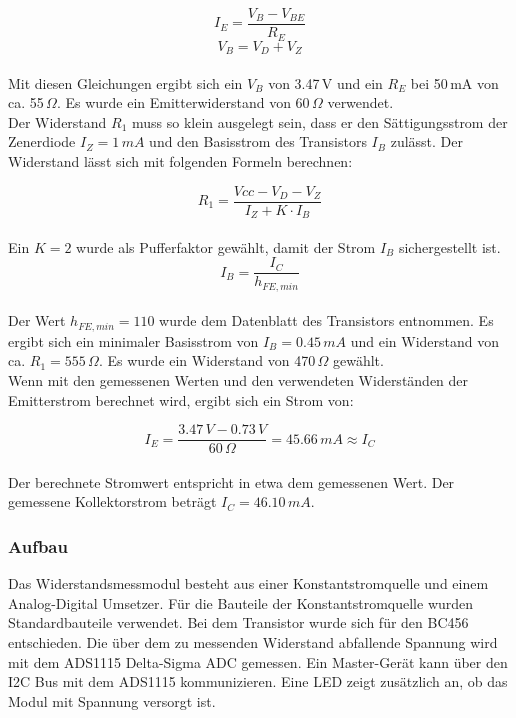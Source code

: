 \vspace{10pt}
\begin{equation}
	I_E = \frac{V_B - V_{BE}}{R_E}
\end{equation}
\begin{equation}
	V_B = V_D + V_Z
\end{equation}
\vspace{10pt}
\\
Mit diesen Gleichungen ergibt sich ein \(V_B\) von 3.47\,V und ein \(R_E\) bei 50\,mA von ca. 55\,\(\Omega\). Es wurde ein Emitterwiderstand von 60\,\(\Omega\) verwendet.
\\
Der Widerstand \(R_1\) muss so klein ausgelegt sein, dass er den Sättigungsstrom der Zenerdiode \(I_Z = 1\,mA\) und den Basisstrom des Transistors \(I_B\) zulässt. Der Widerstand lässt sich mit folgenden Formeln berechnen:

\vspace{10pt}
\begin{equation}
	R_1 = \frac{Vcc - V_D - V_Z}{I_Z + K \cdot I_B}
\end{equation}
\\
Ein \(K = 2\) wurde als Pufferfaktor gewählt, damit der Strom \(I_B\) sichergestellt ist.
\\
\begin{equation}
	I_B = \frac{I_C}{h_{FE,min}}
\end{equation}
\vspace{10pt}
\\
Der Wert \(h_{FE,min} = 110\) wurde dem Datenblatt des Transistors entnommen. Es ergibt sich ein minimaler Basisstrom von \(I_B = 0.45\,mA\) und ein Widerstand von ca. \(R_1 = 555\,\Omega\). Es wurde ein Widerstand von 470\,\(\Omega\) gewählt.
\\
Wenn mit den gemessenen Werten und den verwendeten Widerständen der Emitterstrom berechnet wird, ergibt sich ein Strom von:

\vspace{10pt}
\begin{equation}
	I_E = \frac{3.47\,V - 0.73\,V}{60\,\Omega} = 45.66\,mA \approx I_C
\end{equation}
\\
Der berechnete Stromwert entspricht in etwa dem gemessenen Wert. Der gemessene Kollektorstrom beträgt \(I_C = 46.10\,mA\).

\subsubsection{Aufbau}
Das Widerstandsmessmodul besteht aus einer Konstantstromquelle und einem Analog-Digital Umsetzer. Für die Bauteile der Konstantstromquelle wurden Standardbauteile verwendet. Bei dem Transistor wurde sich für den BC456 entschieden. Die über dem zu messenden Widerstand abfallende Spannung wird mit dem ADS1115 Delta-Sigma ADC gemessen. Ein Master-Gerät kann über den I2C Bus mit dem ADS1115 kommunizieren. Eine LED zeigt zusätzlich an, ob das Modul mit Spannung versorgt ist.

